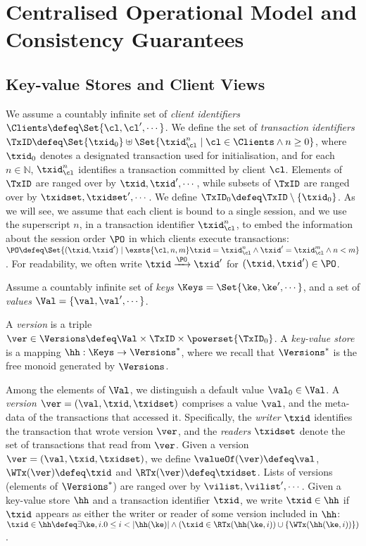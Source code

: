 \section{Centralised Operational Model and Consistency Guarantees}
\label{sec:model}

\subsection{Key-value Stores and Client Views}

We assume a countably infinite set of \emph{client identifiers} $\Clients \defeq \Set{\cl, \cl',\cdots}$. 
We define the set of \emph{transaction identifiers} 
$\TxID \defeq  \Set{\txid_{0}} \uplus \Set{ \txid_{\cl}^{n} \mid \cl \in \Clients \wedge n \geq 0 }$, where 
 $\txid_0$ denotes a designated transaction used for initialisation, 
 and for each $n \in \mathbb{N}$, $\txid_{\cl}^{n}$ identifies a transaction 
 committed by client $\cl$.
Elements of $\TxID$ are ranged over by $\txid, \txid', \cdots$, 
while subsets of $\TxID$ are ranged over by $\txidset, \txidset', \cdots$. 
We define $\TxID_{0} \defeq \TxID \setminus \{ \txid_0\}$.
As we will see, we assume that each client is bound to a single session, and 
we use the superscript $n$, in a transaction identifier $\txid_{\cl}^{n}$, 
to embed the information about the session order $\PO$ in which clients execute 
transactions:  
$\PO \defeq \Set{ (\txid, \txid') \mid \exsts{ \cl, n,m } \txid = \txid_{\cl}^{n} \wedge \txid' = \txid_{\cl}^{m} \wedge n < m}$.
For readability, we often write  $\txid \xrightarrow{\PO} \txid'$ for $(\txid, \txid') \in \PO$.

\begin{definition}
\label{def:his_heap}
\label{def:mkvs}
Assume a countably infinite set of \emph{keys} $\Keys = \Set{\ke, \ke', \cdots}$, 
and a set of \emph{values} $\Val = \{\val, \val', \cdots\}$.

A \emph{version} is a triple $\ver \in \Versions \defeq \Val \times \TxID \times \powerset{\TxID_{0}}$. 
A \emph{key-value store} is a mapping $\hh: \Keys \rightarrow \Versions^{\ast}$, 
where we recall that $\Versions^{\ast}$ is the free monoid generated by $\Versions$.
\end{definition}

Among the elements of $\Val$, we distinguish a default value $\val_0 \in \Val$. 
A \emph{version} $\ver = (\val, \txid, \txidset)$ comprises a value $\val$,
and the meta-data of the transactions that accessed it.
Specifically, the \emph{writer} $\txid$ identifies the transaction that wrote version $\ver$, 
and the \emph{readers} $\txidset$ denote the set of transactions that read from $\ver$.
Given a version $\ver = (\val, \txid, \txidset)$, we define $\valueOf(\ver) \defeq \val$,
$\WTx(\ver) \defeq \txid$ and $\RTx(\ver) \defeq \txidset$. 
Lists of versions (\ie elements of $\Versions^{\ast}$) are ranged over by $\vilist, \vilist',\cdots$.
Given a key-value store $\hh$ and a transaction identifier $\txid$, we write 
$\txid \in \hh$ if $\txid$ appears as either the writer or reader of 
some version included in $\hh$:  $\txid \in \hh \defeq 
\exists \ke, i. 0 \leq i < \lvert \hh(\ke) \rvert \wedge (\txid \in \RTx(\hh(\ke, i)) \cup \{\WTx(\hh(\ke, i))\})$.

